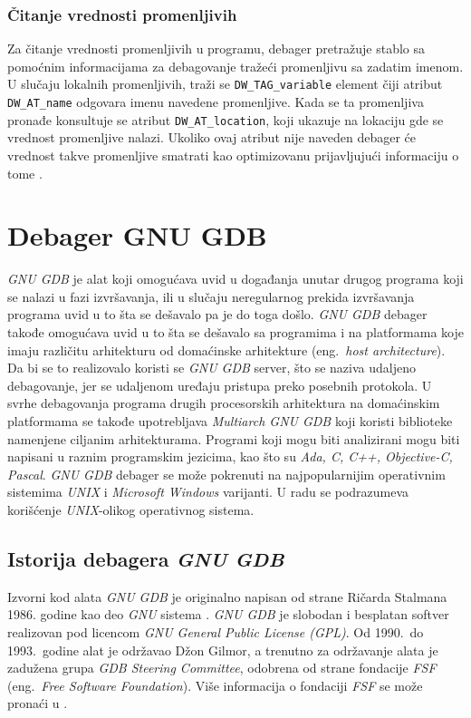 \documentclass[12pt,oneside]{memoir}
\begin{document}
\subsection{Čitanje vrednosti promenljivih}

Za čitanje vrednosti promenljivih u programu, debager pretražuje stablo sa pomoćnim informacijama za debagovanje tražeći promenljivu sa zadatim imenom. U slučaju lokalnih promenljivih, traži se \texttt{DW\_TAG\_variable} element čiji atribut \texttt{DW\_AT\_name} odgovara imenu navedene promenljive. Kada se ta promenljiva pronađe konsultuje se atribut \texttt{DW\_AT\_location}, koji ukazuje na lokaciju gde se vrednost promenljive nalazi. Ukoliko ovaj atribut nije naveden debager će vrednost takve promenljive smatrati kao optimizovanu prijavljujući informaciju o tome \cite{GDB}.

\chapter{Debager GNU GDB}
\label{chp:GDB}

\emph{GNU GDB} je alat koji omogućava uvid u događanja unutar drugog programa koji se nalazi u fazi izvršavanja, ili u slučaju neregularnog prekida izvršavanja programa uvid u to šta se dešavalo pa je do toga došlo. \emph{GNU GDB} debager takođe omogućava uvid u to šta se dešavalo sa programima i na platformama koje imaju različitu arhitekturu od domaćinske arhitekture (eng.~\emph{host architecture}). Da bi se to realizovalo koristi se \emph{GNU GDB} server, što se naziva udaljeno debagovanje, jer se udaljenom uređaju pristupa preko posebnih protokola. U svrhe debagovanja programa drugih procesorskih arhitektura na domaćinskim platformama se takođe upotrebljava \emph{Multiarch GNU GDB} koji koristi biblioteke namenjene ciljanim arhitekturama. Programi koji mogu biti analizirani mogu biti napisani u raznim programskim jezicima, kao što su \emph{Ada, C, C++, Objective-C, Pascal}. \emph{GNU GDB} debager se može pokrenuti na najpopularnijim operativnim sistemima \emph{UNIX} i \emph{Microsoft Windows} varijanti. U radu se podrazumeva korišćenje \emph{UNIX}-olikog operativnog sistema.

\section{Istorija debagera \emph{GNU GDB}}

Izvorni kod alata \emph{GNU GDB} je originalno napisan od strane Ričarda Stalmana 1986. godine kao deo \emph{GNU} sistema \cite{GDBDOC}. \emph{GNU GDB} je slobodan i besplatan softver realizovan pod licencom \emph{GNU General Public License (GPL)}. Od 1990.~do 1993.~godine alat je održavao Džon Gilmor, a trenutno za održavanje alata je zadužena grupa \emph{GDB Steering Committee}, odobrena od strane fondacije \emph{FSF} (eng.~\emph{Free Software Foundation}). Više informacija o fondaciji \emph{FSF} se može pronaći u \cite{FSF}.
\end{document}

